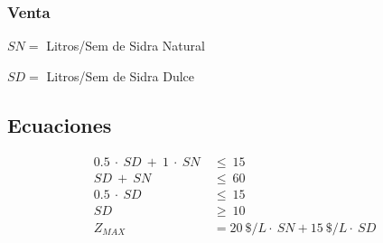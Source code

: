 \documentclass[a4paper,10pt]{article}
\begin{document}
 \subsubsection{Venta}
\vspace{2mm}
 $ SN = $ Litros/Sem de Sidra Natural
 
 $ SD = $ Litros/Sem de Sidra Dulce
 \vspace{2mm}
 
\subsection{Ecuaciones}

\begin{align*}
0.5\ \cdot \ SD\ + \ 1\ \cdot \ SN \ &\leq \ 15  \\
 SD\ +\ SN \ &\leq \ 60  \\
 0.5\ \cdot \ SD\ &\leq \ 15  \\
 SD \ &\geq\ 10  \\
 Z_{MAX} &= 20 \ \$/L \cdot \ SN + 15 \ \$/L \cdot \ SD \\
\end{align*}
\end{document}
